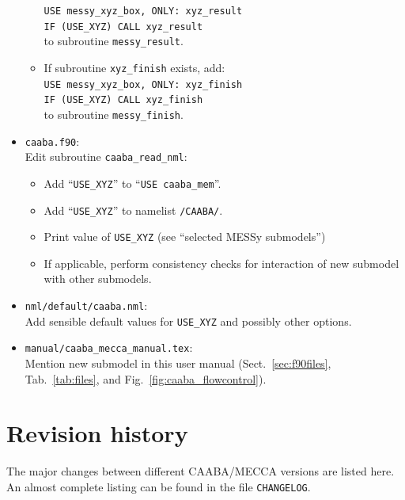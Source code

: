 \documentclass[twoside]{article}
\begin{document}
\begin{itemize}
\begin{itemize}
    \verb|USE messy_xyz_box, ONLY: xyz_result|\\
    \verb|IF (USE_XYZ) CALL xyz_result|\\
    to subroutine \verb|messy_result|.
  \item If subroutine \verb|xyz_finish| exists, add:\\
    \verb|USE messy_xyz_box, ONLY: xyz_finish|\\
    \verb|IF (USE_XYZ) CALL xyz_finish|\\
    to subroutine \verb|messy_finish|.
  \end{itemize}
\item \verb|caaba.f90|:\\
  Edit subroutine \verb|caaba_read_nml|:
  \begin{itemize}
  \item Add ``\verb|USE_XYZ|'' to ``\verb|USE caaba_mem|''.
  \item Add ``\verb|USE_XYZ|'' to namelist \verb|/CAABA/|.
  \item Print value of \verb|USE_XYZ| (see ``selected MESSy submodels'')
  \item If applicable, perform consistency checks for interaction of new
    submodel with other submodels.
  \end{itemize}
\item \verb|nml/default/caaba.nml|:\\
  Add sensible default values for \verb|USE_XYZ| and possibly other
  options.
\item \verb|manual/caaba_mecca_manual.tex|:\\
  Mention new submodel in this user manual (Sect.~\ref{sec:f90files},
  Tab.~\ref{tab:files}, and Fig.~\ref{fig:caaba_flowcontrol}).
\end{itemize}

\section{Revision history}

The major changes between different CAABA/MECCA versions are listed
here. An almost complete listing can be found in the file
\verb|CHANGELOG|.


\end{document}
